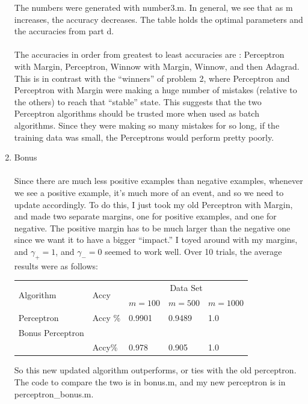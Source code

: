 \begin{enumerate}
The numbers were generated with number3.m. In general, we see that as m increases, the accuracy decreases. The table holds the optimal parameters and the accuracies from part d.\\\\
The accuracies in order from greatest to least accuracies are : Perceptron with Margin, Perceptron, Winnow with Margin, Winnow, and then Adagrad. This is in contrast with the ``winners'' of problem 2, where Perceptron and Perceptron with Margin were making a huge number of mistakes (relative to the others) to reach that ``stable'' state. This suggests that the two Perceptron algorithms should be trusted more when used as batch algorithms. Since they were making so many mistakes for so long, if the training data was small, the Perceptrons would perform pretty poorly. 





\item Bonus\\\\
 Since there are much less positive examples than negative examples, whenever we see a positive example, it's much more of an event, and so we need to update accordingly. To do this, I just took my old Perceptron with Margin, and made two separate margins, one for positive examples, and one for negative. The positive margin has to be much larger than the negative one since we want it to have a bigger ``impact.'' I toyed around with my margins, and $\gamma_+ = 1$, and $\gamma_- = 0$ seemed to work well. Over 10 trials, the average results were as follows:\\
      \begin{center}
  \begin{table}[H]
    \begin{tabular}{|p{4.3cm}<{\centering}|p{2.5cm}<{\centering}|p{2.7cm}<{\centering}|p{2.7cm}<{\centering}|p{2.7cm}<{\centering}|}
      \hline
      \multirow{2}{*}{Algorithm} & \multirow{2}{*}{Accy} & \multicolumn{3}{|c|}{Data Set} \\
      \cline{3-5}
 & & $m=100$& $m=500$& $m=1000$\\
 \hline
      Perceptron    & Accy \%               &0.9901                             &0.9489   &1.0                              \\ \hline
      Bonus Perceptron & \\
      & Accy\% &0.978  &0.905 &1.0 \\ \hline \hline
    \end{tabular}
    \end{table}
    \end{center}
So this new updated algorithm outperforms, or ties with the old perceptron. The code to compare the two is in bonus.m, and my new perceptron is in perceptron\_bonus.m.
\end{enumerate}



